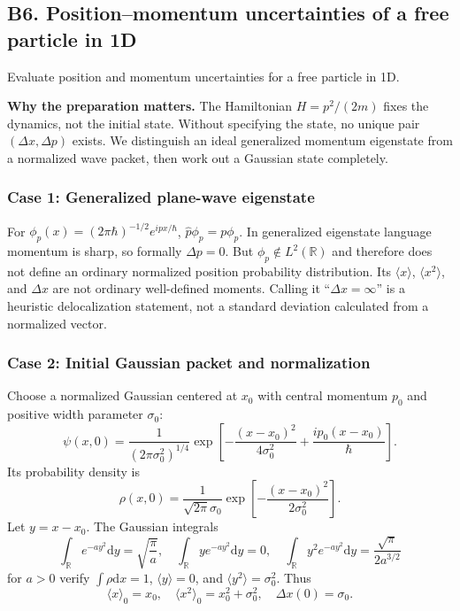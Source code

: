\documentclass[11pt,a4paper]{article}
\newcommand{\dd}{\mathrm{d}}
\newcommand{\R}{\mathbb R}
\begin{document}
\subsection{B6. Position--momentum uncertainties of a free particle in 1D}
\begin{questionbox}Evaluate position and momentum uncertainties for a free particle in 1D.\end{questionbox}
\textbf{Why the preparation matters.} The Hamiltonian $H=p^2/(2m)$ fixes the dynamics, not the initial state. Without specifying the state, no unique pair $(\Delta x,\Delta p)$ exists. We distinguish an ideal generalized momentum eigenstate from a normalized wave packet, then work out a Gaussian state completely.

\subsubsection{Case 1: Generalized plane-wave eigenstate}
For $\phi_p(x)=(2\pi\hbar)^{-1/2}e^{ipx/\hbar}$, $\hat p\phi_p=p\phi_p$. In generalized eigenstate language momentum is sharp, so formally $\Delta p=0$. But $\phi_p\notin L^2(\R)$ and therefore does not define an ordinary normalized position probability distribution. Its $\langle x\rangle$, $\langle x^2\rangle$, and $\Delta x$ are not ordinary well-defined moments. Calling it ``$\Delta x=\infty$'' is a heuristic delocalization statement, not a standard deviation calculated from a normalized vector.

\subsubsection{Case 2: Initial Gaussian packet and normalization}
Choose a normalized Gaussian centered at $x_0$ with central momentum $p_0$ and positive width parameter $\sigma_0$:
\begin{equation}\label{eq:gauss0}
\boxed{\psi(x,0)=\frac1{(2\pi\sigma_0^2)^{1/4}}
\exp\left[-\frac{(x-x_0)^2}{4\sigma_0^2}+\frac{ip_0(x-x_0)}\hbar\right]}.
\end{equation}
Its probability density is
\begin{equation}
\rho(x,0)=\frac1{\sqrt{2\pi}\sigma_0}
\exp\left[-\frac{(x-x_0)^2}{2\sigma_0^2}\right].
\end{equation}
Let $y=x-x_0$. The Gaussian integrals
\begin{equation}\label{eq:gaussints}
\int_{\R}e^{-ay^2}\dd y=\sqrt{\frac\pi a},\quad
\int_{\R}ye^{-ay^2}\dd y=0,\quad
\int_{\R}y^2e^{-ay^2}\dd y=\frac{\sqrt\pi}{2a^{3/2}}
\end{equation}
for $a>0$ verify $\int\rho\dd x=1$, $\langle y\rangle=0$, and $\langle y^2\rangle=\sigma_0^2$. Thus
\begin{equation}
\boxed{\langle x\rangle_0=x_0},\quad
\boxed{\langle x^2\rangle_0=x_0^2+\sigma_0^2},\quad
\boxed{\Delta x(0)=\sigma_0}.
\end{equation}
\end{document}
